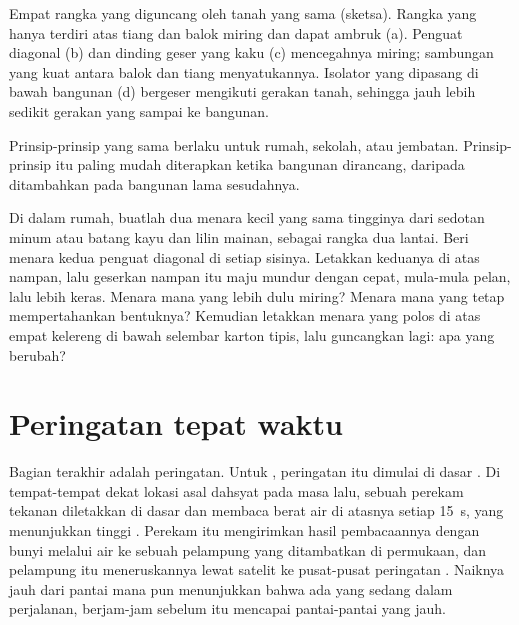 \begin{omfigure}
{\small Empat rangka yang diguncang oleh tanah yang sama (sketsa). Rangka
yang hanya terdiri atas tiang dan balok miring dan dapat ambruk (a).
Penguat diagonal (b) dan dinding geser yang kaku (c) mencegahnya miring;
sambungan yang kuat antara balok dan tiang menyatukannya. Isolator yang
dipasang di bawah bangunan (d) bergeser mengikuti gerakan tanah, sehingga
jauh lebih sedikit gerakan yang sampai ke bangunan.}
\label{fig:g9:natural-risks:buildings}
\end{omfigure}

Prinsip-prinsip yang sama berlaku untuk rumah, sekolah, atau jembatan.
Prinsip-prinsip itu paling mudah diterapkan ketika bangunan dirancang,
daripada ditambahkan pada bangunan lama sesudahnya.

\begin{inthelab}
Di dalam rumah, buatlah dua menara kecil yang sama tingginya dari sedotan
minum atau batang kayu dan lilin mainan, sebagai rangka dua lantai. Beri
menara kedua penguat diagonal di setiap sisinya. Letakkan keduanya di atas
nampan, lalu geserkan nampan itu maju mundur dengan cepat, mula-mula
pelan, lalu lebih keras. Menara mana yang lebih dulu miring? Menara mana
yang tetap mempertahankan bentuknya? Kemudian letakkan menara yang polos
di atas empat kelereng di bawah selembar karton tipis, lalu guncangkan
lagi: apa yang berubah?
\end{inthelab}

\section{Peringatan tepat waktu}

Bagian terakhir  adalah peringatan. Untuk , peringatan
itu dimulai di dasar . Di tempat-tempat dekat lokasi asal
 dahsyat pada masa lalu, sebuah perekam tekanan diletakkan
di dasar  dan membaca berat air di atasnya setiap \qty{15}{s}, yang
menunjukkan tinggi . Perekam itu mengirimkan hasil
pembacaannya dengan bunyi melalui air ke sebuah pelampung yang ditambatkan
di permukaan, dan pelampung itu meneruskannya lewat satelit ke
pusat-pusat peringatan . Naiknya  jauh dari pantai
mana pun menunjukkan bahwa ada  yang sedang dalam perjalanan,
berjam-jam sebelum  itu mencapai pantai-pantai yang jauh.

